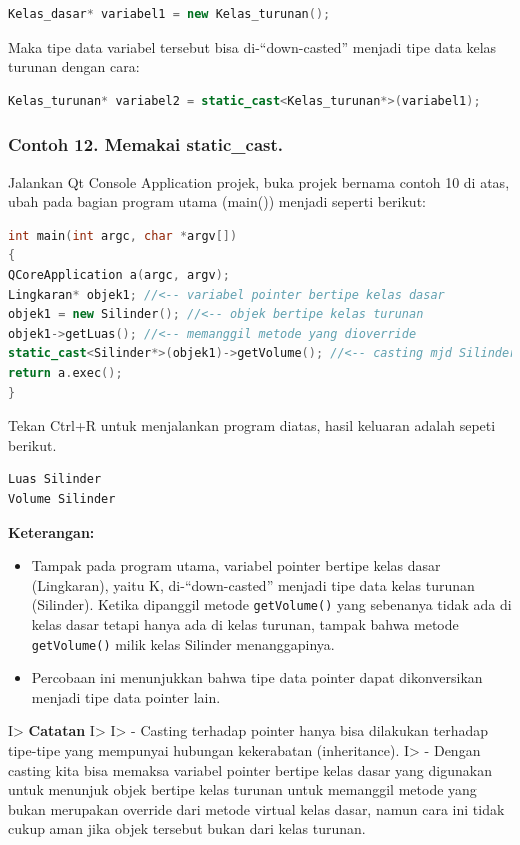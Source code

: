 \begin{lstlisting}[language=c++]
Kelas_dasar* variabel1 = new Kelas_turunan();
\end{lstlisting}

Maka tipe data variabel tersebut bisa di-``down-casted'' menjadi tipe
data kelas turunan dengan cara:

\begin{lstlisting}[language=c++]
Kelas_turunan* variabel2 = static_cast<Kelas_turunan*>(variabel1);
\end{lstlisting}

\subsubsection*{Contoh 12. Memakai static\_cast.}

Jalankan Qt Console Application projek, buka projek bernama contoh 10 di
atas, ubah pada bagian program utama (main()) menjadi seperti berikut:

\begin{lstlisting}[language=c++]
int main(int argc, char *argv[])
{
QCoreApplication a(argc, argv);
Lingkaran* objek1; //<-- variabel pointer bertipe kelas dasar
objek1 = new Silinder(); //<-- objek bertipe kelas turunan
objek1->getLuas(); //<-- memanggil metode yang dioverride
static_cast<Silinder*>(objek1)->getVolume(); //<-- casting mjd Silinder
return a.exec();
}
\end{lstlisting}

Tekan Ctrl+R untuk menjalankan program diatas, hasil keluaran adalah
sepeti berikut.

\begin{verbatim}
Luas Silinder
Volume Silinder
\end{verbatim}

\textbf{Keterangan:}

\begin{itemize}
\tightlist
\item
  Tampak pada program utama, variabel pointer bertipe kelas dasar
  (Lingkaran), yaitu K, di-``down-casted'' menjadi tipe data kelas
  turunan (Silinder). Ketika dipanggil metode \texttt{getVolume()} yang
  sebenanya tidak ada di kelas dasar tetapi hanya ada di kelas turunan,
  tampak bahwa metode \texttt{getVolume()} milik kelas Silinder
  menanggapinya.
\item
  Percobaan ini menunjukkan bahwa tipe data pointer dapat dikonversikan
  menjadi tipe data pointer lain.
\end{itemize}

I\textgreater{} \textbf{Catatan} I\textgreater{} I\textgreater{} -
Casting terhadap pointer hanya bisa dilakukan terhadap tipe-tipe yang
mempunyai hubungan kekerabatan (inheritance). I\textgreater{} - Dengan
casting kita bisa memaksa variabel pointer bertipe kelas dasar yang
digunakan untuk menunjuk objek bertipe kelas turunan untuk memanggil
metode yang bukan merupakan override dari metode virtual kelas dasar,
namun cara ini tidak cukup aman jika objek tersebut bukan dari kelas
turunan.

